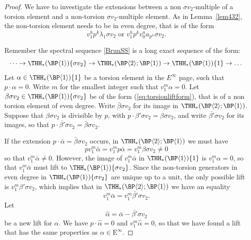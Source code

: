 \begin{proof}
  We have to investigate the extensions between a non $\sigma v_2$-multiple of  a torsion element and a non-torsion $\sigma v_2$-multiple element. As in Lemma~\ref{lem432}, the non-torsion element needs to be in even degree, that is of the form
  \begin{equation} \label{eq:torsionliftform}
    v_1^h p^k \lambda_1 \sigma v_2 \text{ or } v_1^h p^k v_0^n a_{p^n} \sigma v_2.
  \end{equation}

  Remember the spectral sequence \eqref{BrunSS} is a long exact sequence of the form:
  \begin{equation}
    \dots \rightarrow \THH_*(\BP \langle 1 \rangle)\{ \sigma v_2\} \rightarrow \THH_*(\BP \langle 2 \rangle ; \BP \langle 1 \rangle) \rightarrow \THH_*(\BP \langle 1 \rangle)\{1\} \rightarrow \dots
  \end{equation}
  Let $\alpha \in \THH_*(\BP \langle 1 \rangle)\{1\}$ be a torsion element in the $E^\infty$ page, such that $p \cdot \alpha = 0$. Write $m$ for the smallest integer such that $v_1^m \alpha = 0$. Let $\beta \sigma v_2 \in \THH_*(\BP \langle 1 \rangle)\{ \sigma v_2\}$ be of the form (\ref{eq:torsionliftform}), that is of a non torsion element of even degree. Write $\bar{\beta} \sigma v_2$ for its image in $\THH_*(\BP \langle 2 \rangle ; \BP \langle 1 \rangle)$. Suppose that $\beta \sigma v_2$ is divisible by $p$, with $p \cdot \beta' \sigma v_2 = \beta \sigma v_2$, and write $\bar{\beta'} \sigma v_2$ for its images, so that $p \cdot \bar{\beta'} \sigma v_2 = \bar{\beta} \sigma v_2$.

  If the extension $p \cdot \bar{\alpha} = \bar{\beta} \sigma v_2$ occurs, in $\THH_*(\BP \langle 2 \rangle ; \BP \langle 1 \rangle)$ we must have
  \begin{equation}
    p v_1^m \bar{\alpha} = v_1^m p \bar{\alpha} = v_1^m \beta \sigma v_2 \neq 0
  \end{equation}
  so that $v_1^m \bar{\alpha} \neq 0$. However, the image of $v_1^m \bar{\alpha}$ in $\THH_*(\BP \langle 1 \rangle)\{1\}$ is $v_1^m \alpha = 0$, so that $v_1^m \bar{\alpha}$ must lift to $\THH_*(\BP \langle 1 \rangle)\{ \sigma v_2\}$. Since the non-torsion generators in even degree in $\THH_*(\BP \langle 1 \rangle)\{ \sigma v_2\}$ are unique up to a unit, the only possible lift is $v_1^m \beta' \sigma v_2$, which implies that in $\THH_*(\BP \langle 2 \rangle ; \BP \langle 1 \rangle)$ we have an equality
  \begin{equation}
    v_1^m \bar{\alpha} = v_1^m \bar{\beta'} \sigma v_2.
  \end{equation}
  Let
  \begin{equation}
    \hat{\alpha} = \bar{\alpha} - \bar{\beta'} \sigma v_2
  \end{equation}
  be a new lift for $\alpha$. We have $p \cdot \hat{\alpha} = 0$ and $v_1^m \hat{\alpha} = 0$, so that we have found a lift that has the same properties as $\alpha \in \mathrm{E}^\infty$.


\end{proof}
